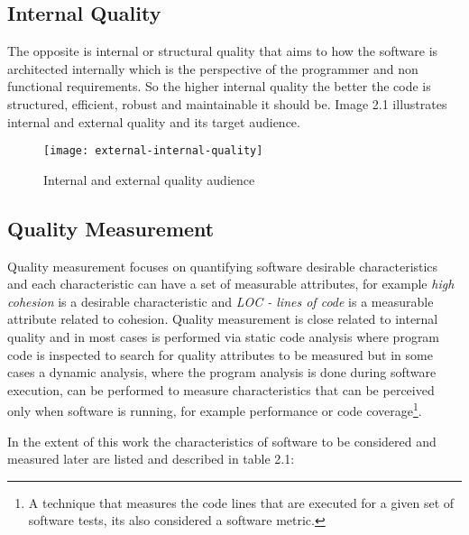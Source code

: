  \subsection{Internal Quality}
 The opposite is internal or structural quality that aims to how the software is architected internally which is the perspective of the programmer and non functional requirements. So the higher internal quality the better the code is structured, efficient, robust and maintainable it should be. Image 2.1 illustrates internal and external quality and its target audience.


\begin{figure}[h]
\caption{Internal and external quality audience}
\centering
\texttt{[image: external-internal-quality]}
\end{figure}
\FloatBarrier


\subsection{Quality Measurement}
Quality measurement focuses on quantifying software desirable characteristics and each characteristic can have a set of measurable attributes, for example \textit{high cohesion} is a desirable characteristic and \textit{LOC - lines of code} is a measurable attribute related to cohesion. Quality measurement is close related to internal quality and in most cases is performed via static code analysis where program code is inspected to search for quality attributes to be measured but in some cases a dynamic analysis, where the program analysis is done during software execution, can be performed to measure characteristics that can be perceived only when software is running, for example performance or code coverage\footnote{A technique that measures the code lines that are executed for a given set of software tests, its also considered a software metric.}.     

In the extent of this work the characteristics of software to be considered and measured later are listed and described in table 2.1:  

